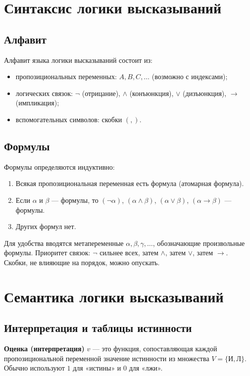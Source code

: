 \documentclass[10pt]{article}
\begin{document}
\section{Синтаксис логики высказываний}

\subsection{Алфавит}
Алфавит языка логики высказываний состоит из:
\begin{itemize}
\item пропозициональных переменных: \( A, B, C, \dots \) (возможно с индексами);
\item логических связок: \(\neg\) (отрицание), \(\land\) (конъюнкция), \(\lor\) (дизъюнкция), \(\to\) (импликация);
\item вспомогательных символов: скобки \(( , )\).
\end{itemize}

\subsection{Формулы}
Формулы определяются индуктивно:
\begin{enumerate}
\item Всякая пропозициональная переменная есть формула (атомарная формула).
\item Если \(\alpha\) и \(\beta\) — формулы, то \((\neg\alpha)\), \((\alpha\land\beta)\), \((\alpha\lor\beta)\), \((\alpha\to\beta)\) — формулы.
\item Других формул нет.
\end{enumerate}
Для удобства вводятся метапеременные \(\alpha,\beta,\gamma,\dots\), обозначающие произвольные формулы. Приоритет связок: \(\neg\) сильнее всех, затем \(\land\), затем \(\lor\), затем \(\to\). Скобки, не влияющие на порядок, можно опускать.

\section{Семантика логики высказываний}

\subsection{Интерпретация и таблицы истинности}
\textbf{Оценка (интерпретация)} \(v\) — это функция, сопоставляющая каждой пропозициональной переменной значение истинности из множества \(V = \{\textit{И}, \textit{Л}\}\). Обычно используют \(1\) для «истины» и \(0\) для «лжи».
\end{document}
